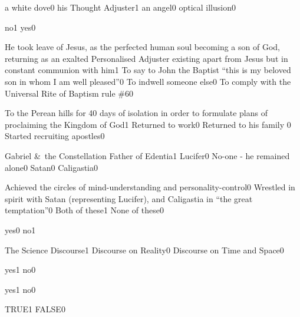 {a white dove}{0}
{his Thought Adjuster}{1}
{an angel}{0}
{optical illusion}{0}
\qstop

{no}{1}
{yes}{0}
\qstop

{He took leave of Jesus, as the perfected human soul becoming a son of God, returning as an exalted Personalised Adjuster existing apart from Jesus but in constant communion with him}{1}
{To say to John the Baptist ``this is my beloved son in whom I am well pleased''}{0}
{To indwell someone else}{0}
{To comply with the Universal Rite of Baptism rule \#6}{0}
\qstop

{To the Perean hills for 40 days of isolation in order to formulate plans of proclaiming the Kingdom of God}{1}
{Returned to work}{0}
{Returned to his family }{0}
{Started recruiting apostles}{0}
\qstop

{Gabriel \&\ the Constellation Father of Edentia}{1}
{Lucifer}{0}
{No-one - he remained alone}{0}
{Satan}{0}
{Caligastia}{0}
\qstop

{Achieved the circles of mind-understanding and personality-control}{0}
{Wrestled in spirit with Satan (representing Lucifer), and Caligastia in ``the great temptation''}{0}
{Both of these}{1}
{None of these}{0}
\qstop

{yes}{0}
{no}{1}
\qstop

{The Science Discourse}{1}
{Discourse on Reality}{0}
{Discourse on Time and Space}{0}
\qstop

{yes}{1}
{no}{0}
\qstop

{yes}{1}
{no}{0}
\qstop

{TRUE}{1}
{FALSE}{0}
\qstop

